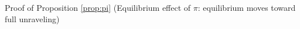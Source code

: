 Proof of Proposition \ref{prop:pi} (Equilibrium effect of $\pi$: equilibrium moves toward full unraveling)